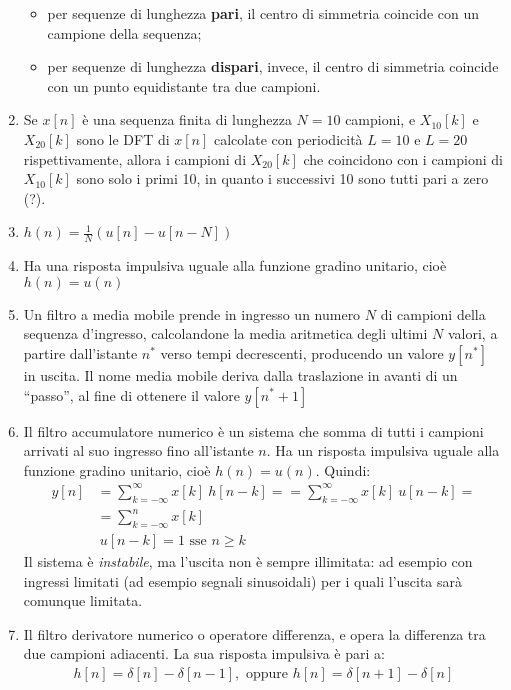\documentclass[
]{article}
\providecommand{\tightlist}{%
  \setlength{\itemsep}{0pt}\setlength{\parskip}{0pt}}
\begin{document}
\begin{enumerate}
  \begin{itemize}
  \tightlist
  \item
    per sequenze di lunghezza \textbf{pari}, il centro di simmetria
    coincide con un campione della sequenza;
  \item
    per sequenze di lunghezza \textbf{dispari}, invece, il centro di
    simmetria coincide con un punto equidistante tra due campioni.
  \end{itemize}
\item
  Se \(x[n]\) è una sequenza finita di lunghezza \(N=10\) campioni, e
  \(X_{10}[k]\) e \(X_{20}[k]\) sono le DFT di \(x[n]\) calcolate con
  periodicità \(L=10\) e \(L=20\) rispettivamente, allora i campioni di
  \(X_{20}[k]\) che coincidono con i campioni di \(X_{10}[k]\) sono solo
  i primi 10, in quanto i successivi 10 sono tutti pari a zero (?).
\item
  \(h(n) = \frac{1}{N}(u[n]-u[n-N])\)
\item
  Ha una risposta impulsiva uguale alla funzione gradino unitario, cioè
  \(h(n) = u(n)\)
\item
  Un filtro a media mobile prende in ingresso un numero \(N\) di
  campioni della sequenza d'ingresso, calcolandone la media aritmetica
  degli ultimi \(N\) valori, a partire dall'istante \(n^{*}\) verso
  tempi decrescenti, producendo un valore \(y[n^{*}]\) in uscita. Il
  nome media mobile deriva dalla traslazione in avanti di un ``passo'',
  al fine di ottenere il valore \(y[n^{*}+1]\)
\item
  Il filtro accumulatore numerico è un sistema che somma di tutti i
  campioni arrivati al suo ingresso fino all'istante \(n\). Ha un
  risposta impulsiva uguale alla funzione gradino unitario, cioè
  \(h(n)=u(n)\). Quindi: \begin{align*}
  y[n] &=\sum_{k=-\infty}^{\infty}x[k] \ h[n-k] = =\sum_{k=-\infty}^{\infty}x[k] \ u[n-k] = \\
  & =\sum_{k=-\infty}^{n}x[k] \\ &\ u[n-k] = 1 \text{ sse } n\geq k
  \end{align*} Il sistema è \emph{instabile}, ma l'uscita non è sempre
  illimitata: ad esempio con ingressi limitati (ad esempio segnali
  sinusoidali) per i quali l'uscita sarà comunque limitata.
\item
  Il filtro derivatore numerico o operatore differenza, e opera la
  differenza tra due campioni adiacenti. La sua risposta impulsiva è
  pari a: \begin{align*}
  h[n] = \delta[n] - \delta[n-1], \text{ oppure } h[n]= \delta[n+1]-\delta[n] \\

\end{align*}
\end{enumerate}
\end{document}
